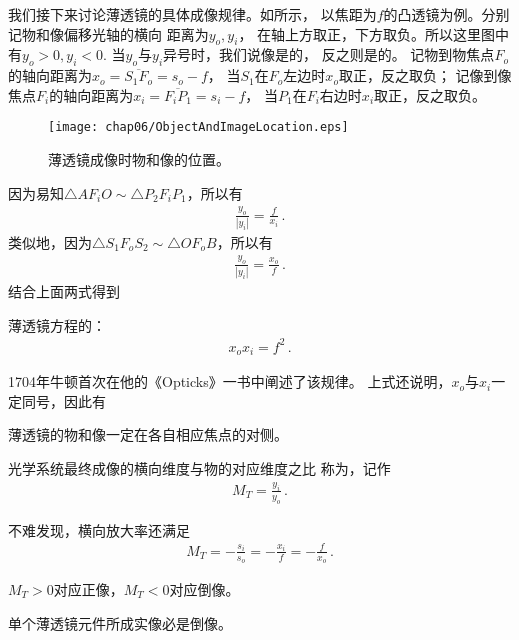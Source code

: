 我们接下来讨论薄透镜的具体成像规律。如所示，
以焦距为$f$的凸透镜为例。分别记物和像偏移光轴的横向
距离为$y_o, y_i$，
在轴上方取正，下方取负。所以这里图中有$y_o>0, y_i<0$.
当$y_o$与$y_i$异号时，我们说像是的，
反之则是的。
记物到物焦点$F_o$的轴向距离为$x_o=\overline{S_1F_o}=s_o-f$，
当$S_1$在$F_o$左边时$x_o$取正，反之取负；
记像到像焦点$F_i$的轴向距离为$x_i=\overline{F_iP_1}=s_i-f$，
当$P_1$在$F_i$右边时$x_i$取正，反之取负。
\begin{figure}[htbp]
    \centering\texttt{[image: chap06/ObjectAndImageLocation.eps]}
    \caption{薄透镜成像时物和像的位置。}
    \label{fig:6.39}
\end{figure}

因为易知$\triangle AF_iO\sim\triangle P_2F_iP_1$，所以有
\begin{align}
    \frac{y_o}{|y_i|}=\frac{f}{x_i}\, .
\end{align}
类似地，因为$\triangle S_1F_oS_2\sim\triangle OF_oB$，所以有
\begin{align}
    \frac{y_o}{|y_i|}=\frac{x_o}{f}\, .
\end{align}
结合上面两式得到
\begin{proposition}
    薄透镜方程的：
    \begin{align}
        x_ox_i=f^2\, .
    \end{align}
\end{proposition}
1704年牛顿首次在他的《Opticks》一书中阐述了该规律。
上式还说明，$x_o$与$x_i$一定同号，因此有
\begin{corollary}
    薄透镜的物和像一定在各自相应焦点的对侧。
\end{corollary}

\begin{definition}
    光学系统最终成像的横向维度与物的对应维度之比
    称为，记作
    \begin{align}
        M_T=\frac{y_i}{y_o}\, .
    \end{align}
\end{definition}
不难发现，横向放大率还满足
\begin{align}
    M_T=-\frac{s_i}{s_o}=-\frac{x_i}{f}=-\frac{f}{x_o}\, .
\end{align}

\begin{corollary}
    $M_T>0$对应正像，$M_T<0$对应倒像。
\end{corollary}
\begin{corollary}
    单个薄透镜元件所成实像必是倒像。
\end{corollary}

